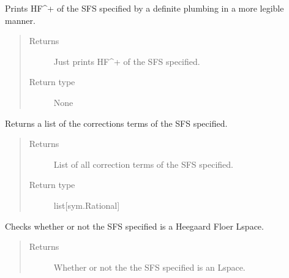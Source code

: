 \documentclass[letterpaper,10pt,english]{sphinxmanual}
\begin{document}
\begin{fulllineitems}
\begin{fulllineitems}
\end{fulllineitems}


\begin{fulllineitems}
\label{\detokenize{soapy:soapy.SFS.print_HF}}
\sphinxAtStartPar
Prints HF\textasciicircum{}+ of the SFS specified by a definite plumbing in a more legible manner.
\begin{quote}\begin{description}
\item[{Returns}] \leavevmode
\sphinxAtStartPar
Just prints HF\textasciicircum{}+ of the SFS specified.

\item[{Return type}] \leavevmode
\sphinxAtStartPar
None

\end{description}\end{quote}

\end{fulllineitems}


\begin{fulllineitems}
\label{\detokenize{soapy:soapy.SFS.correction_terms}}
\sphinxAtStartPar
Returns a list of the corrections terms of the SFS specified.
\begin{quote}\begin{description}
\item[{Returns}] \leavevmode
\sphinxAtStartPar
List of all correction terms of the SFS specified.

\item[{Return type}] \leavevmode
\sphinxAtStartPar
list{[}sym.Rational{]}

\end{description}\end{quote}

\end{fulllineitems}


\begin{fulllineitems}
\label{\detokenize{soapy:soapy.SFS.is_lspace}}
\sphinxAtStartPar
Checks whether or not the SFS specified is a Heegaard Floer L\sphinxhyphen{}space.
\begin{quote}\begin{description}
\item[{Returns}] \leavevmode
\sphinxAtStartPar
Whether or not the the SFS specified is an L\sphinxhyphen{}space.


\end{description}
\end{quote}
\end{fulllineitems}
\end{fulllineitems}
\end{document}
